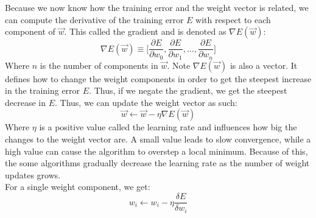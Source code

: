 Because we now know how the training error and the weight vector is related, we can compute the derivative of the training error $E$ with respect to each component of $\overrightarrow{w}$. This called the gradient and is denoted as $\nabla E(\overrightarrow{w})$:
\begin{equation}
    \nabla E(\overrightarrow{w}) \equiv \big[ \frac{\partial E}{\partial w_0}, \frac{\partial E}{\partial w_1}, \dots, \frac{\partial E}{\partial w_n} \big]
\end{equation}
Where $n$ is the number of components in $\overrightarrow{w}$. Note $\nabla E(\overrightarrow{w})$ is also a vector. It defines how to change the weight components in order to get the steepest increase in the training error $E$. Thus, if we negate the gradient, we get the steepest decrease in $E$. Thus, we can update the weight vector as such:
\begin{equation}
    \overrightarrow{w} \gets \overrightarrow{w} - \eta \nabla E(\overrightarrow{w})
\end{equation}
Where $\eta$ is a positive value called the learning rate and influences how big the changes to the weight vector are.
A small value leads to slow convergence, while a high value can cause the algorithm to overstep a local minimum. Because of this, the some algorithms gradually decrease the learning rate as the number of weight updates grows.\\
For a single weight component, we get:
\begin{equation}
    \label{eq:weightcomponentupdate}
    w_i \gets w_i - \eta \frac{\delta E}{\delta w_i}
\end{equation}

